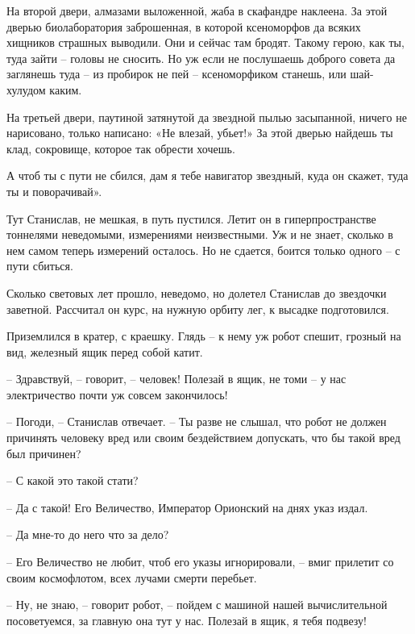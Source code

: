\documentclass[ebook,oneside,final,openright]{memoir}
\begin{document}
На второй двери, алмазами выложенной, жаба в скафандре наклеена. За этой дверью биолаборатория заброшенная, в которой ксеноморфов да всяких хищников страшных выводили. Они и сейчас там бродят. Такому герою, как ты, туда зайти – головы не сносить. Но уж если не послушаешь доброго совета да заглянешь туда – из пробирок не пей – ксеноморфиком станешь, или шай-хулудом каким.\par
\par
На третьей двери, паутиной затянутой да звездной пылью засыпанной, ничего не нарисовано, только написано: «Не влезай, убьет!» За этой дверью найдешь ты клад, сокровище, которое так обрести хочешь.\par
\par
А чтоб ты с пути не сбился, дам я тебе навигатор звездный, куда он скажет, туда ты и поворачивай».\par
\par
Тут Станислав, не мешкая, в путь пустился. Летит он в гиперпространстве тоннелями неведомыми, измерениями неизвестными. Уж и не знает, сколько в нем самом теперь измерений осталось. Но не сдается, боится только одного – с пути сбиться.\par
\par
Сколько световых лет прошло, неведомо, но долетел Станислав до звездочки заветной. Рассчитал он курс, на нужную орбиту лег, к высадке подготовился.\par
\par
Приземлился в кратер, с краешку. Глядь – к нему уж робот спешит, грозный на вид, железный ящик перед собой катит.\par
– Здравствуй, – говорит, – человек! Полезай в ящик, не томи – у нас электричество почти уж совсем закончилось!\par
– Погоди, – Станислав отвечает. – Ты разве не слышал, что робот не должен причинять человеку вред или своим бездействием допускать, что бы такой вред был причинен?\par
– С какой это такой стати?\par
– Да с такой! Его Величество, Император Орионский на днях указ издал.\par
– Да мне-то до него что за дело?\par
– Его Величество не любит, чтоб его указы игнорировали, – вмиг прилетит со своим космофлотом, всех лучами смерти перебьет.\par
– Ну, не знаю, – говорит робот, – пойдем с машиной нашей вычислительной посоветуемся, за главную она тут у нас. Полезай в ящик, я тебя подвезу!\par
\end{document}
